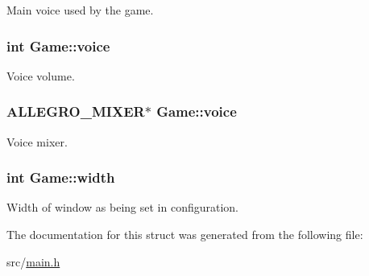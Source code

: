 \-Main voice used by the game. \hypertarget{structGame_a5523ac4fdb8fdbd2e86b58a3fbc2e6d0}{
\subsubsection[{voice}]{\setlength{\rightskip}{0pt plus 5cm}int {\bf \-Game\-::voice}}}\label{structGame_a5523ac4fdb8fdbd2e86b58a3fbc2e6d0}
\-Voice volume. \hypertarget{structGame_acc651129cb9fafedf0588e229827c543}{
\subsubsection[{voice}]{\setlength{\rightskip}{0pt plus 5cm}\-A\-L\-L\-E\-G\-R\-O\-\_\-\-M\-I\-X\-E\-R$\ast$ {\bf \-Game\-::voice}}}\label{structGame_acc651129cb9fafedf0588e229827c543}
\-Voice mixer. \hypertarget{structGame_a06b5a675d7c0f6a9b58d395872b1a4e7}{
\subsubsection[{width}]{\setlength{\rightskip}{0pt plus 5cm}int {\bf \-Game\-::width}}}\label{structGame_a06b5a675d7c0f6a9b58d395872b1a4e7}
\-Width of window as being set in configuration. 

\-The documentation for this struct was generated from the following file\-:\begin{DoxyCompactItemize}
\item 
src/\hyperlink{main_8h}{main.\-h}\end{DoxyCompactItemize}

